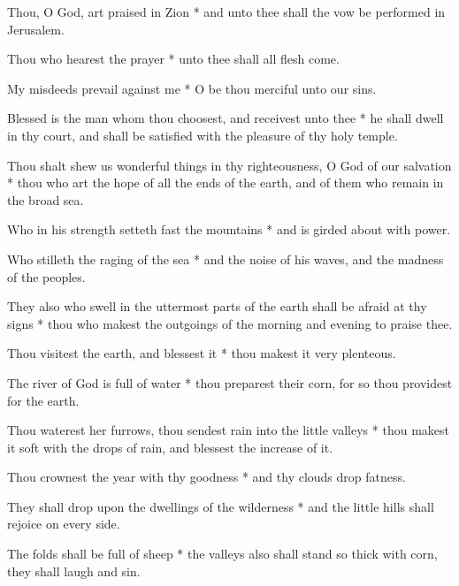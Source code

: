 Thou, O God, art praised in Zion * and unto thee shall the vow be performed in Jerusalem.

Thou who hearest the prayer * unto thee shall all flesh come.

My misdeeds prevail against me * O be thou merciful unto our sins.

Blessed is the man whom thou choosest, and receivest unto thee * he shall dwell in thy court, and shall be satisfied with the pleasure of thy holy temple.

Thou shalt shew us wonderful things in thy righteousness, O God of our salvation * thou who art the hope of all the ends of the earth, and of them who remain in the broad sea.

Who in his strength setteth fast the mountains * and is girded about with power.

Who stilleth the raging of the sea * and the noise of his waves, and the madness of the peoples.

They also who swell in the uttermost parts of the earth shall be afraid at thy signs * thou who makest the outgoings of the morning and evening to praise thee.

Thou visitest the earth, and blessest it * thou makest it very plenteous.

The river of God is full of water * thou preparest their corn, for so thou providest for the earth.

Thou waterest her furrows, thou sendest rain into the little valleys * thou makest it soft with the drops of rain, and blessest the increase of it.

Thou crownest the year with thy goodness * and thy clouds drop fatness.

They shall drop upon the dwellings of the wilderness * and the little hills shall rejoice on every side.

The folds shall be full of sheep * the valleys also shall stand so thick with corn, they shall laugh and sin.